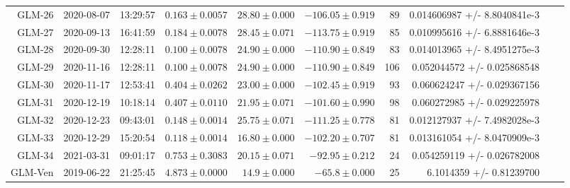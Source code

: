 \begin{table}
\begin{tabular}{rrrrrrrrrr}
GLM-26 & 2020-08-07 & 13:29:57 & $0.163\pm 0.0057$ & $28.80 \pm 0.000$ & $-106.05 \pm  0.919$ & 89           & 0.014606987 +/- 8.8040841e-3  \\
GLM-27 & 2020-09-13 & 16:41:59 & $0.184\pm 0.0078$ & $28.45 \pm 0.071$ & $-113.75 \pm  0.919$ & 85           & 0.010995616 +/- 6.8881646e-3  \\
GLM-28 & 2020-09-30 & 12:28:11 & $0.100\pm 0.0078$ & $24.90 \pm 0.000$ & $-110.90 \pm  0.849$ & 83           & 0.014013965 +/- 8.4951275e-3  \\
GLM-29 & 2020-11-16 & 12:28:11 & $0.100\pm 0.0078$ & $24.90 \pm 0.000$ & $-110.90 \pm  0.849$ &106           & 0.052044572 +/- 0.025868548   \\
GLM-30 & 2020-11-17 & 12:53:41 & $0.404\pm 0.0262$ & $23.00 \pm 0.000$ & $-102.45 \pm  0.919$ & 93           & 0.060624247 +/- 0.029367156   \\
GLM-31 & 2020-12-19 & 10:18:14 & $0.407\pm 0.0110$ & $21.95 \pm 0.071$ & $-101.60 \pm  0.990$ & 98           & 0.060272985 +/- 0.029225978   \\
GLM-32 & 2020-12-23 & 09:43:01 & $0.148\pm 0.0014$ & $25.75 \pm 0.071$ & $-111.25 \pm  0.778$ & 81           & 0.012127937 +/- 7.4982028e-3  \\
GLM-33 & 2020-12-29 & 15:20:54 & $0.118\pm 0.0014$ & $16.80 \pm 0.000$ & $-102.20 \pm  0.707$ & 81           & 0.013161054 +/- 8.0470909e-3  \\
GLM-34 & 2021-03-31 & 09:01:17 & $0.753\pm 0.3083$ & $20.15 \pm 0.071$ & $-92.95 \pm  0.212$  & 24           & 0.054259119 +/- 0.026782008   \\
GLM-Ven& 2019-06-22 & 21:25:45 & $4.873\pm 0.0000$ & $14.9 \pm 0.000$  & $-65.8 \pm 0.000$    & 25           & 6.1014359 +/- 0.81239700      \\ \hline
\end{tabular}
\end{table}

